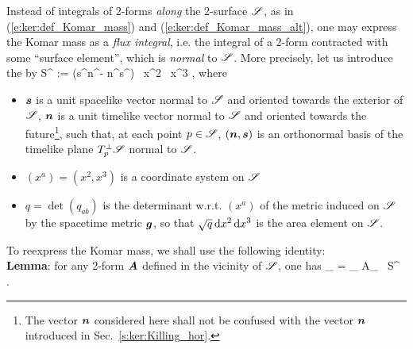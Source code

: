 Instead of integrals of 2-forms \emph{along} the 2-surface $\mathscr{S}$, as in (\ref{e:ker:def_Komar_mass})
and (\ref{e:ker:def_Komar_mass_alt}), one may
express the Komar mass as a \emph{flux integral}, i.e. the integral of a 2-form
contracted with some ``surface element'', which is \emph{normal} to $\mathscr{S}$.
More precisely, let us introduce the
 by
\be
    \D S^{\alpha\beta} := (s^\alpha n^\beta - n^\alpha s^\beta) \, \D x^2 \, \D x^3 ,
\ee
where
\begin{itemize}
\item
$\bm{s}$ is a unit spacelike vector normal to $\mathscr{S}$ and oriented towards the
exterior of $\mathscr{S}$, $\bm{n}$ is a unit timelike vector normal to $\mathscr{S}$ and oriented towards the
future\footnote{The vector $\bm{n}$ considered here shall not be confused with
the vector $\bm{n}$ introduced in Sec.~\ref{s:ker:Killing_hor}.}, such that, at each point $p\in\mathscr{S}$, $(\bm{n},\bm{s})$ is an orthonormal basis
of the timelike plane $T^\perp_p\mathscr{S}$ normal to $\mathscr{S}$.
\item $(x^a)=(x^2,x^3)$ is a coordinate system on $\mathscr{S}$
\item $q = \det(q_{ab})$ is the determinant w.r.t. $(x^a)$ of the metric
induced on $\mathscr{S}$ by the spacetime metric $\bm{g}$, so that
$\sqrt{q}\, \mathrm{d} x^2 \, \mathrm{d} x^3$ is the area element on $\mathscr{S}$.
\end{itemize}
To reexpress the Komar mass, we shall use the following identity:\\
\textbf{Lemma}: for any 2-form $\bm{A}$ defined in the vicinity of $\mathscr{S}$, one has
\be \label{e:ker:int_star_A}
    \int_{\Sp} \star {} =  \int_{\Sp} A_{\mu\nu} \, \D S^{\mu\nu} .
\ee
